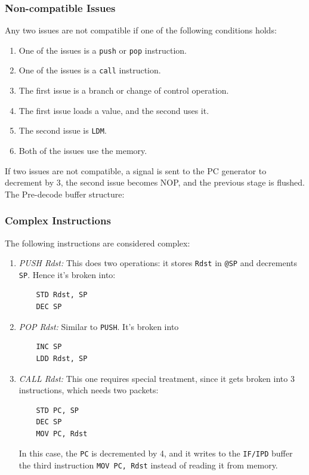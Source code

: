 \documentclass[12pt]{article}
\begin{document}
\subsubsection{Non-compatible Issues}
Any two issues are not compatible if one of the following conditions holds:
\begin{enumerate}
\item One of the issues is a \texttt{push} or \texttt{pop} instruction.
\item One of the issues is a \texttt{call} instruction.
\item The first issue is a branch or change of control operation.
\item The first issue loads a value, and the second uses it.
\item The second issue is \texttt{LDM}.
\item Both of the issues use the memory.
\end{enumerate}
If two issues are not compatible, a signal is sent to the PC generator to decrement by 3, the second issue becomes NOP, and the previous stage is flushed.
The Pre-decode  buffer structure: 

\subsubsection{Complex Instructions}
The following instructions are considered complex:
\begin{enumerate}
\item \emph{PUSH Rdst:} This does two operations: it stores \texttt{Rdst} in \texttt{@SP} and decrements \texttt{SP}. Hence it's broken into:
\begin{lstlisting}
	STD	Rdst, SP
	DEC	SP
\end{lstlisting}
\item \emph{POP Rdst:} Similar to \texttt{PUSH}. It's broken into
\begin{lstlisting}
	INC	SP
	LDD	Rdst, SP
\end{lstlisting}
\item \emph{CALL Rdst:} This one requires special treatment, since it gets broken into 3 instructions, which needs two packets:
\begin{lstlisting}
	STD	PC,	SP
	DEC	SP
	MOV	PC,	Rdst
\end{lstlisting}
In this case, the \texttt{PC} is decremented by 4, and it writes to the \texttt{IF/IPD} buffer the third instruction \texttt{MOV PC, Rdst} instead of reading it from memory.
\end{enumerate}
\end{document}
